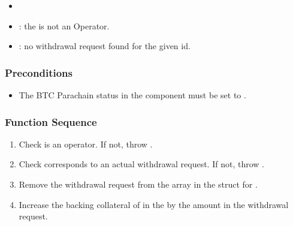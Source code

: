 \documentclass[a4paper,10pt,english]{sphinxmanual}
\begin{document}
\begin{itemize}
\item {} 

\end{itemize}

\begin{itemize}
\item {} 
: the  is not an Operator.

\item {} 
: no withdrawal request found for the given id.

\end{itemize}


\subsubsection{Preconditions}
\label{\detokenize{spec/nomination:id35}}\begin{itemize}
\item {} 
The BTC Parachain status in the {\hyperref[\detokenize{spec/security:security}]{}} component must be set to .

\end{itemize}


\subsubsection{Function Sequence}
\label{\detokenize{spec/nomination:id36}}\begin{enumerate}
%
\item {} 
Check  is an operator. If not, throw .

\item {} 
Check  corresponds to an actual withdrawal request. If not, throw .

\item {} 
Remove the withdrawal request from the  array in the  struct for .

\item {} 
Increase the backing collateral of  in the {\hyperref[\detokenize{spec/vault-registry:vault-registry}]{}} by the amount in the withdrawal request.

\end{enumerate}
\end{document}
